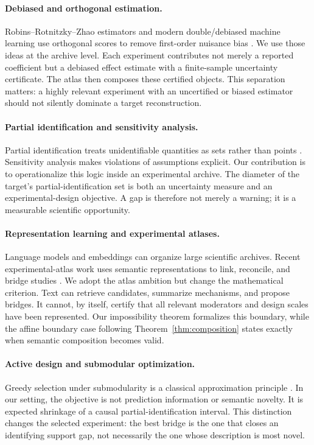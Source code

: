 \documentclass[11pt]{article}
\numberwithin{equation}{section}
\newcommand{\1}{\mathbf 1}
\begin{document}
\paragraph{Debiased and orthogonal estimation.}
Robins--Rotnitzky--Zhao estimators and modern double/debiased machine learning use orthogonal scores to remove first-order nuisance bias \citep{robins1994estimation,chernozhukov2018double}.  We use those ideas at the archive level.  Each experiment contributes not merely a reported coefficient but a debiased effect estimate with a finite-sample uncertainty certificate.  The atlas then composes these certified objects.  This separation matters: a highly relevant experiment with an uncertified or biased estimator should not silently dominate a target reconstruction.

\paragraph{Partial identification and sensitivity analysis.}
Partial identification treats unidentifiable quantities as sets rather than points \citep{manski2003partial}.  Sensitivity analysis makes violations of assumptions explicit.  Our contribution is to operationalize this logic inside an experimental archive.  The diameter of the target's partial-identification set is both an uncertainty measure and an experimental-design objective.  A gap is therefore not merely a warning; it is a measurable scientific opportunity.

\paragraph{Representation learning and experimental atlases.}
Language models and embeddings can organize large scientific archives.  Recent experimental-atlas work uses semantic representations to link, reconcile, and bridge studies \citep{zhang2026atlas}.  We adopt the atlas ambition but change the mathematical criterion.  Text can retrieve candidates, summarize mechanisms, and propose bridges.  It cannot, by itself, certify that all relevant moderators and design scales have been represented.  Our impossibility theorem formalizes this boundary, while the affine boundary case following Theorem~\ref{thm:composition} states exactly when semantic composition becomes valid.

\paragraph{Active design and submodular optimization.}
Greedy selection under submodularity is a classical approximation principle \citep{nemhauser1978analysis}.  In our setting, the objective is not prediction information or semantic novelty.  It is expected shrinkage of a causal partial-identification interval.  This distinction changes the selected experiment: the best bridge is the one that closes an identifying support gap, not necessarily the one whose description is most novel.
\end{document}
